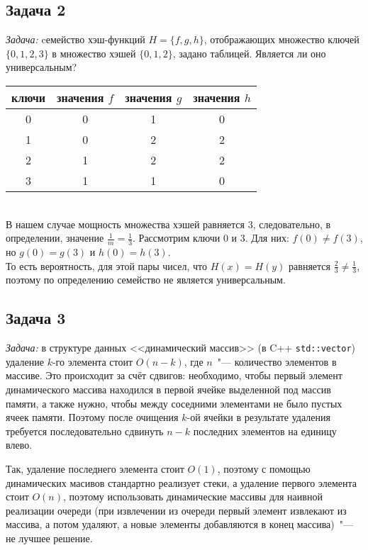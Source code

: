 \documentclass[a4paper,12pt]{article} %
\begin{document}
\subsection*{Задача 2}

\textit{Задача: } cемейство хэш-функций $H = \{f,g,h\}$, отображающих множество ключей $\{0,1,2,3\}$ в множество хэшей $\{0,1,2\}$, задано таблицей. Является ли оно универсальным? \\


\begin{tabular}{|c|c|c|c|}
\hline
ключи&значения $f$&значения $g$&значения $h$\\
\hline
0&0&1&0\\
\hline
1&0&2&2\\
\hline
2&1&2&2\\
\hline
3&1&1&0\\
\hline
\end{tabular}\\


В нашем случае мощность множества хэшей равняется 3, следовательно, в определении, значение $ \frac{1}{m} = \frac{1}{3} $. Рассмотрим ключи 0 и 3. Для них: $ f(0) \neq f(3) $, но $ g(0) = g(3) $ и $ h(0) = h(3) $.\\
То есть вероятность, для этой пары чисел, что $ H(x) = H(y) $ равняется $ \frac{2}{3}   \neq \frac{1}{3}$, поэтому по определению семейство не является универсальным.



\subsection*{Задача 3}
\textit{Задача:} в структуре данных <<динамический массив>> (в C++ \texttt{std::vector}) удаление $k$-го элемента стоит $O(n-k)$, где $n$~"--- количество элементов в массиве. Это происходит за счёт сдвигов: необходимо, чтобы первый элемент динамического массива находился в первой ячейке выделенной под массив памяти, а также нужно, чтобы между соседними элементами не было пустых ячеек памяти. Поэтому после очищения $k$-ой ячейки в результате удаления требуется последовательно сдвинуть $n-k$ последних элементов на единицу влево.

Так, удаление последнего элемента стоит $O(1)$, поэтому с помощью динамических масивов стандартно реализует стеки, а удаление первого элемента стоит $O(n)$, поэтому использовать динамические массивы для наивной реализации очереди (при извлечении из очереди первый элемент извлекают из массива, а потом удаляют, а новые элементы добавляются в конец массива)~"--- не лучшее решение.
\end{document}
